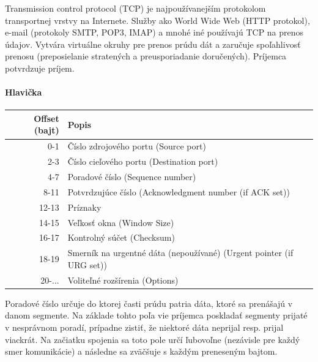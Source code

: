 \documentclass[10pt,a4paper]{article}
\begin{document}
Transmission control protocol (TCP) je najpoužívanejším protokolom transportnej vrstvy na Internete. Služby ako World Wide Web (HTTP protokol), e-mail (protokoly SMTP, POP3, IMAP) a mnohé iné používajú TCP na prenos údajov.
Vytvára virtuálne okruhy pre prenos prúdu dát a zaručuje spoľahlivosť prenosu (preposielanie stratených a preusporiadanie doručených). Príjemca potvrdzuje príjem.  

\paragraph{Hlavička}
\begin{center}
\begin{tabular}{ r | l }       
  Offset (bajt) & Popis\\
\hline              
  0-1 & Číslo zdrojového portu (Source port)\\
  2-3 & Číslo cieľového portu (Destination port)\\
  4-7 & Poradové číslo (Sequence number)\\
  8-11 & Potvrdzujúce číslo (Acknowledgment number (if ACK set))\\
  12-13 & Príznaky\\
  14-15 & Veľkosť okna (Window Size)\\
  16-17 & Kontrolný súčet (Checksum)\\
  18-19 & Smerník na urgentné dáta (nepoužívané) (Urgent pointer (if URG set))\\
  20-... & Voliteľné rozšírenia (Options)\\
\end{tabular}
\end{center}

Poradové číslo určuje do ktorej časti prúdu patria dáta, ktoré sa prenášajú v danom segmente. Na základe tohto poľa vie príjemca poskladať segmenty prijaté v nesprávnom poradí, prípadne zistiť, že niektoré dáta neprijal resp. prijal viackrát. Na začiatku spojenia sa toto pole určí ľubovoľne (nezávisle pre každý smer komunikácie) a následne sa zväčšuje s každým preneseným bajtom.
\end{document}
